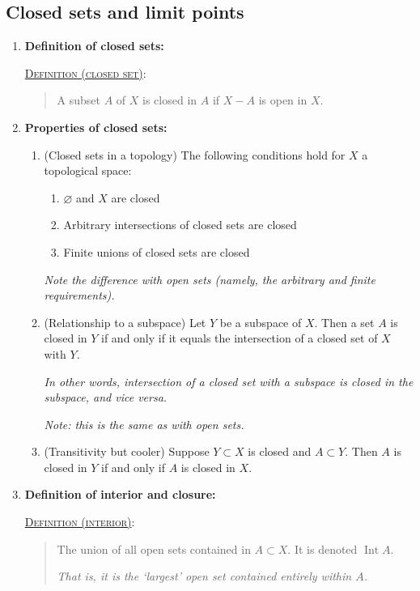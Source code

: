 \documentclass[letterpaper, 12pt]{book}
\newcommand{\defn}[2]{\textsc{\underline{Definition (#1)}:}\begin{quote} #2\end{quote}}
\let\emptyset\varnothing
\begin{document}
    \subsection{Closed sets and limit points}
        \begin{enumerate}[resume]
        \item \textbf{Definition of closed sets:} 

            \defn{closed set}{A subset $A$ of $X$ is closed in $A$ if $X-A$ is open in $X$.}
            \item \textbf{Properties of closed sets:}
                \begin{enumerate}
                \item (Closed sets in a topology) The following conditions hold for $X$ a topological space:
                \begin{enumerate}
                \item $\emptyset$ and $X$ are closed
                \item Arbitrary intersections of closed sets are closed
                \item Finite unions of closed sets are closed
                \end{enumerate}
                \textit{Note the difference with open sets (namely, the arbitrary and finite requirements).}

            \item (Relationship to a subspace) Let $Y$ be a subspace of $X$. Then a set $A$ is closed in $Y$ if and only if it equals the intersection of a closed set of $X$ with $Y$.

                \textit{In other words, intersection of a closed set with a subspace is closed in the subspace, and vice versa.}

                \textit{Note: this is the same as with open sets.}
            \item (Transitivity but cooler) Suppose $Y\subset X$ is closed and $A\subset Y$. Then $A$ is closed in $Y$ if and only if $A$ is closed in $X$.
            \end{enumerate}
        \item \textbf{Definition of interior and closure:}

            \defn{interior}{The union of all open sets contained in $A \subset X$. It is denoted $\operatorname{Int}A$.

            \textit{That is, it is the `largest' open set contained entirely within $A$.}}


\end{enumerate}
\end{document}
